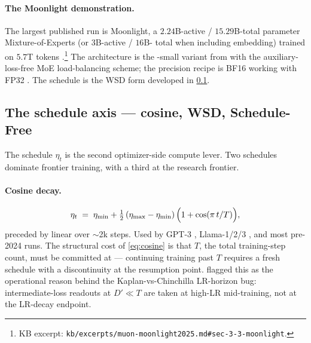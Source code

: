 \paragraph{The Moonlight demonstration.}
The largest published  run is Moonlight, a $2.24$B-active /
$15.29$B-total parameter Mixture-of-Experts (or $3$B-active / $16$B-
total when including embedding) trained on $5.7$T tokens
\citep[\S 3.3]{muon-moonlight2025}.\footnote{KB excerpt:
\nolinkurl{kb/excerpts/muon-moonlight2025.md#sec-3-3-moonlight}.} The
architecture is the -small variant from \citet{deepseek-v3}
with the auxiliary-loss-free MoE load-balancing scheme; the precision
recipe is BF16 working with FP32 . The schedule is the
WSD form developed in \cref{sec:opt-schedules}.

\subsection{The schedule axis --- cosine, WSD, Schedule-Free}
\label{sec:opt-schedules}

The schedule $\eta_t$ is the second optimizer-side compute lever.
Two schedules dominate frontier  training, with a third at the
research frontier.

\paragraph{Cosine decay.}
\citep[Loshchilov \&
Hutter 2017]{muon-moonlight2025}
\begin{equation}
\eta_t \;=\; \eta_{\min} + \tfrac{1}{2}\,(\eta_{\max} - \eta_{\min})\,\Bigl(1 + \cos(\pi\, t / T)\Bigr),
\label{eq:cosine}
\end{equation}
preceded by linear  over $\sim$2k steps. Used by GPT-3
\citep{brown2020}, Llama-1/2/3 \citep{meta-llama3}, and most pre-2024
runs. The structural cost of \cref{eq:cosine} is that $T$, the total
training-step count, must be committed at  --- continuing
training past $T$ requires a fresh schedule with a discontinuity at
the resumption point.  flagged this as the
operational reason behind the Kaplan-vs-Chinchilla LR-horizon bug:
intermediate-loss readouts at $D' \ll T$ are taken at high-LR
mid-training, not at the LR-decay endpoint.

